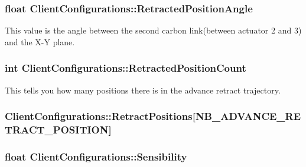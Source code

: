 \subsubsection[{\texorpdfstring{Retracted\+Position\+Angle}{RetractedPositionAngle}}]{\setlength{\rightskip}{0pt plus 5cm}float Client\+Configurations\+::\+Retracted\+Position\+Angle}\hypertarget{struct_client_configurations_ad7d6245d4683b6e31d0438466ea6bb80}{}\label{struct_client_configurations_ad7d6245d4683b6e31d0438466ea6bb80}


This value is the angle between the second carbon link(between actuator 2 and 3) and the X-\/Y plane. 

\subsubsection[{\texorpdfstring{Retracted\+Position\+Count}{RetractedPositionCount}}]{\setlength{\rightskip}{0pt plus 5cm}int Client\+Configurations\+::\+Retracted\+Position\+Count}\hypertarget{struct_client_configurations_a4058c290c5bac0504e511f0f50e5914b}{}\label{struct_client_configurations_a4058c290c5bac0504e511f0f50e5914b}


This tells you how many positions there is in the advance retract trajectory. 

\subsubsection[{\texorpdfstring{Retract\+Positions}{RetractPositions}}]{ Client\+Configurations\+::\+Retract\+Positions\mbox{[}{\bf N\+B\+\_\+\+A\+D\+V\+A\+N\+C\+E\+\_\+\+R\+E\+T\+R\+A\+C\+T\+\_\+\+P\+O\+S\+I\+T\+I\+ON}\mbox{]}}\hypertarget{struct_client_configurations_aaebc19d45af665f9db9322d74021ec22}{}\label{struct_client_configurations_aaebc19d45af665f9db9322d74021ec22}
\subsubsection[{\texorpdfstring{Sensibility}{Sensibility}}]{\setlength{\rightskip}{0pt plus 5cm}float Client\+Configurations\+::\+Sensibility}\hypertarget{struct_client_configurations_a64e61dc032b95f127cd798a9759818d8}{}\label{struct_client_configurations_a64e61dc032b95f127cd798a9759818d8}


